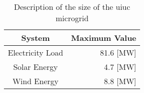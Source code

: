\begin{table}
  \centering
  \caption{Description of the size of the \gls{uiuc} microgrid}
  \label{tab:capacity}
  \begin{tabular}{c|r}
    \hline
    System & Maximum Value\\
    \hline
    Electricity Load & 81.6 [MW]\\
    Solar Energy & 4.7 [MW]\\
    Wind Energy & 8.8 [MW]
  \end{tabular}
\end{table}
